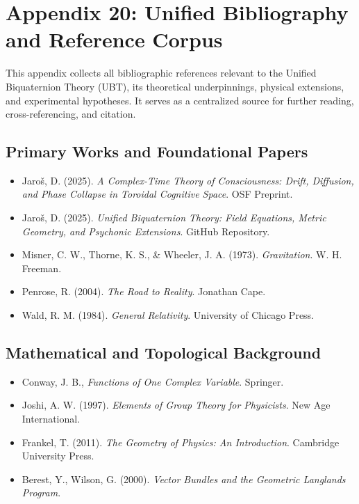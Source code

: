 \appendix
\section*{Appendix 20: Unified Bibliography and Reference Corpus}

This appendix collects all bibliographic references relevant to the Unified Biquaternion Theory (UBT), its theoretical underpinnings, physical extensions, and experimental hypotheses. It serves as a centralized source for further reading, cross-referencing, and citation.

\subsection*{Primary Works and Foundational Papers}
\begin{itemize}
  \item Jaroš, D. (2025). \textit{A Complex-Time Theory of Consciousness: Drift, Diffusion, and Phase Collapse in Toroidal Cognitive Space}. OSF Preprint.
  \item Jaroš, D. (2025). \textit{Unified Biquaternion Theory: Field Equations, Metric Geometry, and Psychonic Extensions}. GitHub Repository.
  \item Misner, C. W., Thorne, K. S., & Wheeler, J. A. (1973). \textit{Gravitation}. W. H. Freeman.
  \item Penrose, R. (2004). \textit{The Road to Reality}. Jonathan Cape.
  \item Wald, R. M. (1984). \textit{General Relativity}. University of Chicago Press.
\end{itemize}

\subsection*{Mathematical and Topological Background}
\begin{itemize}
  \item Conway, J. B., \textit{Functions of One Complex Variable}. Springer.
  \item Joshi, A. W. (1997). \textit{Elements of Group Theory for Physicists}. New Age International.
  \item Frankel, T. (2011). \textit{The Geometry of Physics: An Introduction}. Cambridge University Press.
  \item Berest, Y., Wilson, G. (2000). \textit{Vector Bundles and the Geometric Langlands Program}.
\end{itemize}


